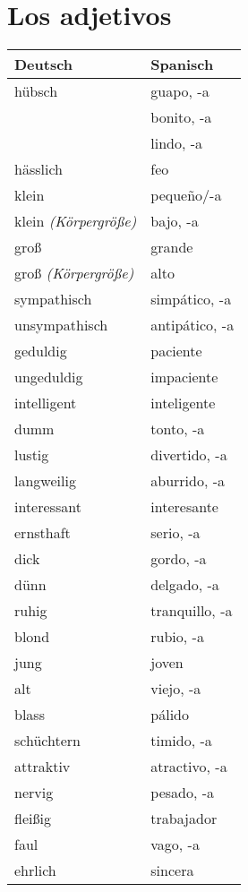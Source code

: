 \documentclass{spanish_summary}
\begin{document}
\chapter*{Los adjetivos}

\begin{longtable}{p{} | p{}} 
\textbf{Deutsch}     & \textbf{Spanisch}                                       \\ \hline
\hline
\endhead %
hübsch & guapo, -a\\
& bonito, -a\\
& lindo, -a\\
hässlich & feo\\
klein & peque\~{n}o/-a\\
klein \textit{(Körpergröße)} & bajo, -a\\
groß & grande\\
groß \textit{(Körpergröße)} & alto\\
sympathisch & simpático, -a\\
unsympathisch & antipático, -a\\
geduldig & paciente \\
ungeduldig & impaciente \\
intelligent & inteligente \\
dumm & tonto, -a\\
lustig & divertido, -a\\
langweilig & aburrido, -a\\
interessant & interesante\\
ernsthaft & serio, -a\\
dick & gordo, -a\\
dünn & delgado, -a\\
ruhig & tranquillo, -a\\
blond & rubio, -a\\
jung & joven\\
alt & viejo, -a\\
blass & pálido\\
schüchtern & timido, -a\\
attraktiv & atractivo, -a\\
nervig & pesado, -a\\
fleißig & trabajador\\
faul & vago, -a\\
ehrlich & sincera\\
\end{longtable}
\end{document}
